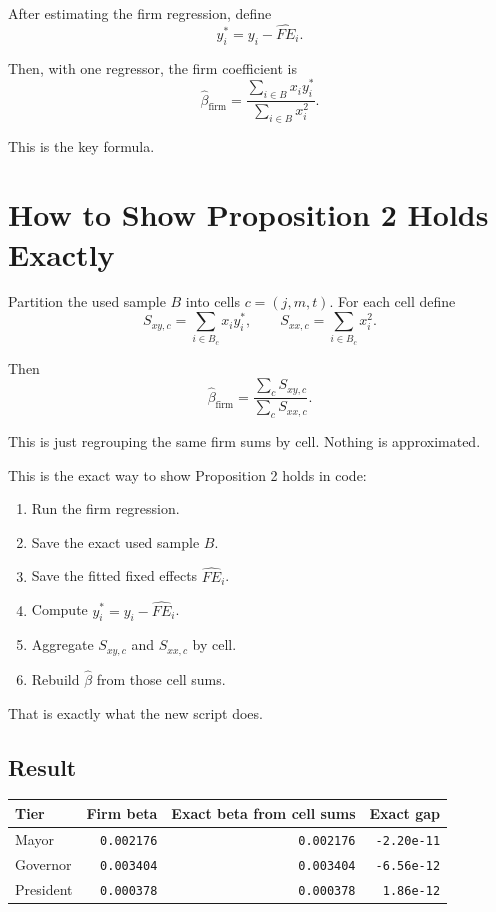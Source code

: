 \documentclass[11pt]{article}
\begin{document}
After estimating the firm regression, define
\[
y_i^* = y_i - \widehat{FE}_i.
\]

Then, with one regressor, the firm coefficient is
\[
\hat\beta_{\text{firm}} =
\frac{\sum_{i \in B} x_i y_i^*}{\sum_{i \in B} x_i^2}.
\]

This is the key formula.

\section{How to Show Proposition 2 Holds Exactly}

Partition the used sample $B$ into cells $c = (j,m,t)$. For each cell define
\[
S_{xy,c} = \sum_{i \in B_c} x_i y_i^*,
\qquad
S_{xx,c} = \sum_{i \in B_c} x_i^2.
\]

Then
\[
\hat\beta_{\text{firm}} =
\frac{\sum_c S_{xy,c}}{\sum_c S_{xx,c}}.
\]

This is just regrouping the same firm sums by cell. Nothing is approximated.

This is the exact way to show Proposition 2 holds in code:
\begin{enumerate}
  \item Run the firm regression.
  \item Save the exact used sample $B$.
  \item Save the fitted fixed effects $\widehat{FE}_i$.
  \item Compute $y_i^* = y_i - \widehat{FE}_i$.
  \item Aggregate $S_{xy,c}$ and $S_{xx,c}$ by cell.
  \item Rebuild $\hat\beta$ from those cell sums.
\end{enumerate}

That is exactly what the new script does.

\subsection*{Result}

\begin{center}
\begin{tabular}{lrrr}
\toprule
Tier & Firm beta & Exact beta from cell sums & Exact gap \\
\midrule
Mayor & \texttt{0.002176} & \texttt{0.002176} & \texttt{-2.20e-11} \\
Governor & \texttt{0.003404} & \texttt{0.003404} & \texttt{-6.56e-12} \\
President & \texttt{0.000378} & \texttt{0.000378} & \texttt{1.86e-12} \\
\bottomrule
\end{tabular}
\end{center}
\end{document}
